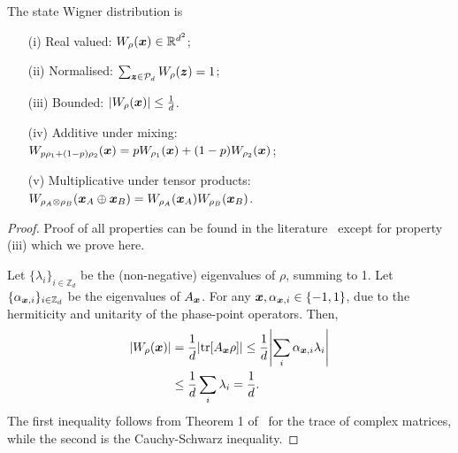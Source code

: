 \documentclass[pra,
aps,
twocolumn,
superscriptaddress,
groupedaddress,
nofootinbib,
reprint
]{revtex4-1}
\begin{document}
\begin{proposition}\label{thm:wstate}
  The state Wigner distribution is
  \begin{enumerate}
    \item[(i)]\label{en:w1} Real valued: $\W{\rho}(\bmx) \in \mathbb{R}^{d^2}$;
    \item[(ii)]\label{en:w2} Normalised: $\sum_{\bmz \in \cal{P}_d} \W[\bmz]{\rho}=1$;
    \item[(iii)]\label{en:w3} Bounded: $\abs{\W[\bmx]{\rho}} \leq \frac{1}{d}$.
    \item[(iv)]\label{en:w4} Additive under mixing: \vspace{2pt}\\
    $\W[\bmx]{p\rho_1 + (1-p)\rho_2} = p\W[\bmx]{\rho_1} + (1-p)\W[\bmx]{\rho_2}$;
    \item[(v)]\label{en:w5} Multiplicative under tensor products: \vspace{2pt}\\
    $\W[\bmx_A \oplus \bmx_B]{\rho_A \otimes \rho_B} = \W[\bmx_A]{\rho_A}\W[\bmx_B]{\rho_B}$.
	\end{enumerate}
\end{proposition}
\begin{proof}
	Proof of all properties can be found in the literature~\cite{cit:veitch,Vourdas_2004,cit:gross3,Wang_2019} except for property (iii) which we prove here.
	
Let $\{\lambda_i\}_{i \in \mathbb{Z}_d}$ be the (non-negative) eigenvalues of $\rho$, summing to 1.
Let $\{\alpha_{\bm{x},i}\}_{i \in \mathbb{Z}_d}$ be the eigenvalues of $A_{\bm{x}}$. For any $\bm{x}, \alpha_{\bm{x},i} \in \{-1, 1\}$, due to the hermiticity and unitarity of the phase-point operators. 
Then,
\begin{align}
	\abs{W_{\rho}(\bm{x})} &= \frac{1}{d}\abs{\mbox{tr}[A_{\bm{x}} \rho]} \leq \frac{1}{d} \abs{\sum_i \alpha_{\bm{x},i} \lambda_i} \nonumber\\ &\leq \frac{1}{d}\sum_i \lambda_i = \frac{1}{d}.
\end{align}
The first inequality follows from Theorem 1 of~\cite{cit:mirsky} for the trace of complex matrices, while the second is the Cauchy-Schwarz inequality.
\end{proof}
\end{document}
